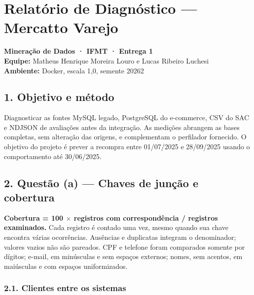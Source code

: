 \documentclass[11pt,a4paper]{article}
\date{}
\begin{document}
\section{Relatório de Diagnóstico --- Mercatto
Varejo}\label{relatuxf3rio-de-diagnuxf3stico-mercatto-varejo}

\textbf{Mineração de Dados · IFMT · Entrega 1}\\
\textbf{Equipe:} Matheus Henrique Moreira Louro e Lucas Ribeiro
Luchesi\\
\textbf{Ambiente:} Docker, escala 1,0, semente 20262

\subsection{1. Objetivo e método}\label{objetivo-e-muxe9todo}

Diagnosticar as fontes MySQL legado, PostgreSQL do e-commerce, CSV do
SAC e NDJSON de avaliações antes da integração. As medições abrangem as
bases completas, sem alteração das origens, e complementam o perfilador
fornecido. O objetivo do projeto é prever a recompra entre 01/07/2025 e
28/09/2025 usando o comportamento até 30/06/2025.

\subsection{2. Questão (a) --- Chaves de junção e
cobertura}\label{questuxe3o-a-chaves-de-junuxe7uxe3o-e-cobertura}

\textbf{Cobertura = 100 \ensuremath{\times} registros com correspondência / registros
examinados.} Cada registro é contado uma vez, mesmo quando sua chave
encontra várias ocorrências. Ausências e duplicatas integram o
denominador; valores vazios não são pareados. CPF e telefone foram
comparados somente por dígitos; e-mail, em minúsculas e sem espaços
externos; nomes, sem acentos, em maiúsculas e com espaços uniformizados.

\subsubsection{2.1. Clientes entre os
sistemas}\label{clientes-entre-os-sistemas}
\end{document}

